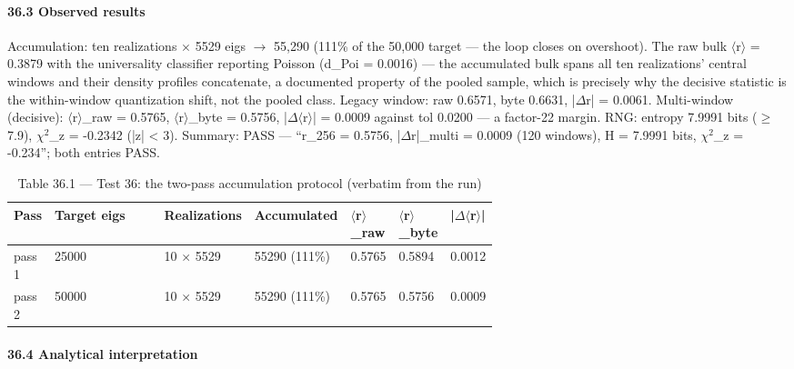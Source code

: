 \documentclass[10pt]{article}
\begin{document}
\paragraph{36.3 Observed results}

Accumulation: ten realizations $\times$ 5529 eigs $\rightarrow$ 55,290 (111\% of the 50,000 target --- the loop closes on overshoot). The raw bulk $\langle$r$\rangle$ = 0.3879 with the universality classifier reporting Poisson (d\_Poi = 0.0016) --- the accumulated bulk spans all ten realizations' central windows and their density profiles concatenate, a documented property of the pooled sample, which is precisely why the decisive statistic is the within-window quantization shift, not the pooled class. Legacy window: raw 0.6571, byte 0.6631, |$\Delta$r| = 0.0061. Multi-window (decisive): $\langle$r$\rangle$\_raw = 0.5765, $\langle$r$\rangle$\_byte = 0.5756, |$\Delta$$\langle$r$\rangle$| = 0.0009 against tol 0.0200 --- a factor-22 margin. RNG: entropy 7.9991 bits ($\ge$ 7.9), $\chi$$^2$\_z = -0.2342 (|z| < 3). Summary: PASS --- ``r\_256 = 0.5756, |$\Delta$r|\_multi = 0.0009 (120 windows), H = 7.9991 bits, $\chi$$^2$\_z = -0.234''; both entries PASS.

\begin{table}[htbp]
\centering
\small
\caption{Table 36.1 --- Test 36: the two-pass accumulation protocol (verbatim from the run)}
\begin{tabular}{lp{0.62\linewidth}lllll}
\toprule
\textbf{Pass} & \textbf{Target eigs} & \textbf{Realizations} & \textbf{Accumulated} & \textbf{$\langle$r$\rangle$\_raw} & \textbf{$\langle$r$\rangle$\_byte} & \textbf{|$\Delta$$\langle$r$\rangle$|} \\
\midrule
pass 1 & 25000 & 10 $\times$ 5529 & 55290 (111\%) & 0.5765 & 0.5894 & 0.0012 \\
pass 2 & 50000 & 10 $\times$ 5529 & 55290 (111\%) & 0.5765 & 0.5756 & 0.0009 \\
\bottomrule
\end{tabular}
\end{table}

\paragraph{36.4 Analytical interpretation}
\end{document}
